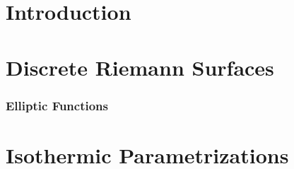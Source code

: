 



\part{Introduction}
\part{Discrete Riemann Surfaces}
\section{Elliptic Functions}

\part{Isothermic Parametrizations}


 